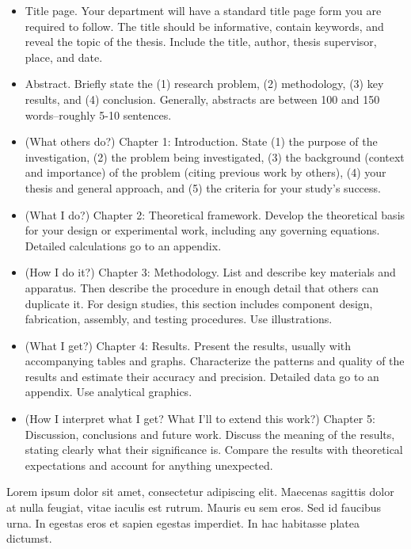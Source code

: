 \begin{itemize}

\item Title page. Your department will have a standard title page form you are required to follow. The title should be informative, contain keywords, and reveal the topic of the thesis. Include the title, author, thesis supervisor, place, and date.

\item Abstract. Briefly state the (1) research problem, (2) methodology, (3) key results, and (4) conclusion. Generally, abstracts are between 100 and 150 words--roughly 5-10 sentences.

\item (What others do?) Chapter 1: Introduction. State (1) the purpose of the investigation, (2) the problem being investigated, (3) the background (context and importance) of the problem (citing previous work by others), (4) your thesis and general approach, and (5) the criteria for your study's success.

\item (What I do?) Chapter 2: Theoretical framework. Develop the theoretical basis for your design or experimental work, including any governing equations. Detailed calculations go to an appendix.

\item (How I do it?) Chapter 3: Methodology. List and describe key materials and apparatus. Then describe the procedure in enough detail that others can duplicate it. For design studies, this section includes component design, fabrication, assembly, and testing procedures. Use illustrations.

\item (What I get?) Chapter 4: Results. Present the results, usually with accompanying tables and graphs. Characterize the patterns and quality of the results and estimate their accuracy and precision. Detailed data go to an appendix. Use analytical graphics.

\item (How I interpret what I get? What I'll to extend this work?) Chapter 5: Discussion, conclusions and future work. Discuss the meaning of the results, stating clearly what their significance is. Compare the results with theoretical expectations and account for anything unexpected.

\end{itemize}

Lorem ipsum dolor sit amet, consectetur adipiscing elit. Maecenas sagittis dolor at nulla feugiat, vitae iaculis est rutrum. Mauris eu sem eros. Sed id faucibus urna. In egestas eros et sapien egestas imperdiet. In hac habitasse platea dictumst.

